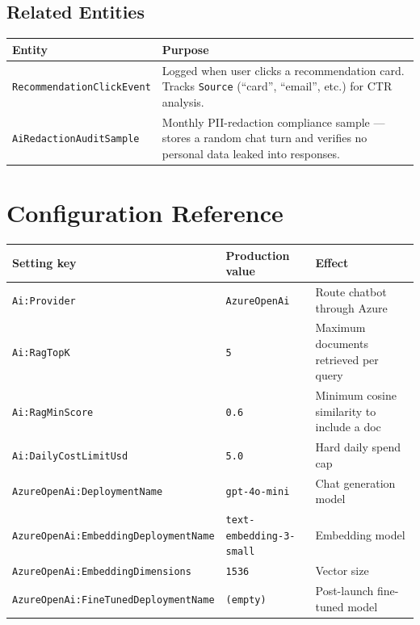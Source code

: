 \documentclass[11pt,a4paper]{article}
\begin{document}
\subsection{Related Entities}

\begin{center}
\begin{tabular}{lp{9cm}}
\toprule
\textbf{Entity} & \textbf{Purpose}\\
\midrule
\texttt{RecommendationClickEvent} &
  Logged when user clicks a recommendation card. Tracks
  \texttt{Source} (``card'', ``email'', etc.) for CTR analysis.\\
\texttt{AiRedactionAuditSample} &
  Monthly PII-redaction compliance sample --- stores a
  random chat turn and verifies no personal data leaked into responses.\\
\bottomrule
\end{tabular}
\end{center}

\section{Configuration Reference}

\begin{center}
\begin{tabular}{lll}
\toprule
\textbf{Setting key} & \textbf{Production value} & \textbf{Effect}\\
\midrule
\texttt{Ai:Provider} & \texttt{AzureOpenAi} & Route chatbot through Azure\\
\texttt{Ai:RagTopK} & \texttt{5} & Maximum documents retrieved per query\\
\texttt{Ai:RagMinScore} & \texttt{0.6} & Minimum cosine similarity to include a doc\\
\texttt{Ai:DailyCostLimitUsd} & \texttt{5.0} & Hard daily spend cap\\
\texttt{AzureOpenAi:DeploymentName} & \texttt{gpt-4o-mini} & Chat generation model\\
\texttt{AzureOpenAi:EmbeddingDeploymentName} & \texttt{text-embedding-3-small} & Embedding model\\
\texttt{AzureOpenAi:EmbeddingDimensions} & \texttt{1536} & Vector size\\
\texttt{AzureOpenAi:FineTunedDeploymentName} & \texttt{(empty)} & Post-launch fine-tuned model\\
\bottomrule
\end{tabular}
\end{center}
\end{document}
